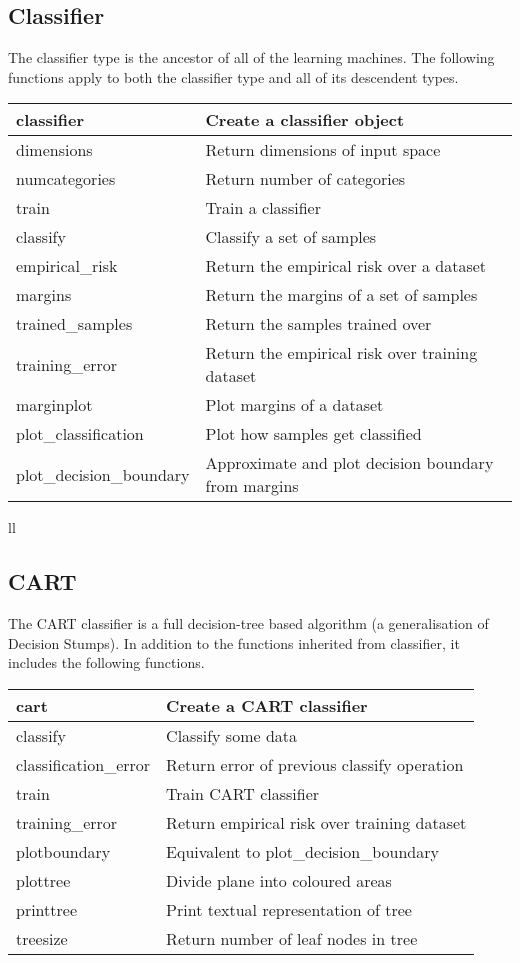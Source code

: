 \subsection{Classifier}

The classifier type is the ancestor of all of the learning machines.
The following functions apply to both the classifier type and all of
its descendent types.

\begin{tabular}{ll}
\hline
classifier		& Create a classifier object \\
\hline	
dimensions		& Return dimensions of input space \\		
numcategories		& Return number of categories \\
\hline
train			& Train a classifier \\
classify		& Classify a set of samples \\
empirical\_risk		& Return the empirical risk over a dataset \\
margins			& Return the margins of a set of samples \\
\hline
trained\_samples		& Return the samples trained over \\
training\_error		& Return the empirical risk over training dataset \\
\hline
marginplot		& Plot margins of a dataset \\
plot\_classification	& Plot how samples get classified \\
plot\_decision\_boundary	& Approximate and plot decision boundary from margins \\
\hline
\end{tabular}{ll}


\subsection{CART}

The CART classifier is a full decision-tree based algorithm (a
generalisation of Decision Stumps).  In addition to the functions
inherited from classifier, it includes the following functions.

\begin{tabular}{ll}
\hline
cart			& Create a CART classifier \\
\hline
classify		& Classify some data \\
classification\_error	& Return error of previous classify operation \\
\hline
train			& Train CART classifier \\
training\_error		& Return empirical risk over training dataset \\
\hline
plotboundary		& Equivalent to plot\_decision\_boundary \\
plottree		& Divide plane into coloured areas \\
printtree		& Print textual representation of tree \\
treesize		& Return number of leaf nodes in tree \\
\hline
\end{tabular}

